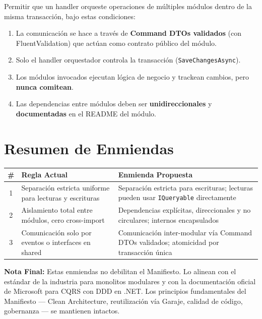 \documentclass[12pt,a4paper]{article}
\begin{document}
\begin{proposalbox}
Permitir que un handler orqueste operaciones de m\'ultiples m\'odulos dentro de la misma transacci\'on, bajo estas condiciones:

\begin{enumerate}[leftmargin=1.5em]
    \item La comunicaci\'on se hace a trav\'es de \textbf{Command DTOs validados} (con FluentValidation) que act\'uan como contrato p\'ublico del m\'odulo.
    \item Solo el handler orquestador controla la transacci\'on (\texttt{SaveChangesAsync}).
    \item Los m\'odulos invocados ejecutan l\'ogica de negocio y trackean cambios, pero \textbf{nunca comitean}.
    \item Las dependencias entre m\'odulos deben ser \textbf{unidireccionales} y \textbf{documentadas} en el README del m\'odulo.
\end{enumerate}
\end{proposalbox}


\section{Resumen de Enmiendas}

\begin{center}
\begin{tabular}{cp{5.5cm}p{5.5cm}}
\toprule
\textbf{\#} & \textbf{Regla Actual} & \textbf{Enmienda Propuesta} \\
\midrule
1 & Separaci\'on estricta uniforme para lecturas y escrituras & Separaci\'on estricta para escrituras; lecturas pueden usar \texttt{IQueryable} directamente \\
\midrule
2 & Aislamiento total entre m\'odulos, cero cross-import & Dependencias expl\'icitas, direccionales y no circulares; internos encapsulados \\
\midrule
3 & Comunicaci\'on solo por eventos o interfaces en shared & Comunicaci\'on inter-modular v\'ia Command DTOs validados; atomicidad por transacci\'on \'unica \\
\bottomrule
\end{tabular}
\end{center}

\vspace{1cm}

\noindent\textbf{Nota Final:} Estas enmiendas no debilitan el Manifiesto. Lo alinean con el est\'andar de la industria para monolitos modulares y con la documentaci\'on oficial de Microsoft para CQRS con DDD en .NET. Los principios fundamentales del Manifiesto --- Clean Architecture, reutilizaci\'on v\'ia Garaje, calidad de c\'odigo, gobernanza --- se mantienen intactos.
\end{document}
